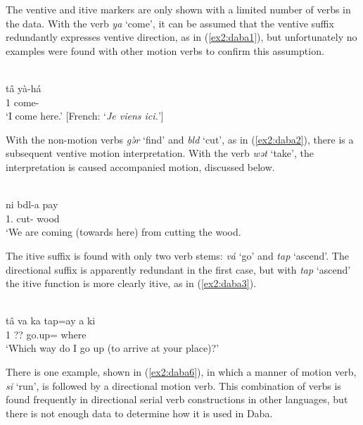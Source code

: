 The ventive and itive markers are only shown with a limited number of verbs in the data. With the verb  \textit{ya} `come', it can be assumed that the ventive suffix redundantly expresses ventive direction, as in (\ref{ex2:daba1}), but unfortunately no examples were found with other motion verbs to confirm this assumption.

\ea\label{ex2:daba1}
 \\
\gll tâ yà-há	\\
1 come- \\
\glt `I come here.' [French: `\textit{Je viens ici.}']
\z 

With the non-motion verbs \textit{gə̀r} `find' and \textit{bld} `cut', as in (\ref{ex2:daba2}), there is a subsequent ventive motion interpretation. With the verb \textit{wət} `take', the interpretation is caused accompanied motion, discussed below.

\ea\label{ex2:daba2}
 \\
\gll ni bdl-a pay \\
1. cut- wood \\
\glt `We are coming (towards here) from cutting the wood. 
\z 

The itive suffix is found with only two verb stems: \textit{vá} `go' and \textit{tap} `ascend'. The directional suffix is apparently redundant in the first case, but with \textit{tap} `ascend' the itive function is more clearly itive, as in (\ref{ex2:daba3}). 

\ea\label{ex2:daba3}
 \\
\gll tâ va ka tap=ay a ki \\
1  ?? go.up=  where	\\
\glt `Which way do I go up (to arrive at your place)?' 
\z 

There is one example, shown in (\ref{ex2:daba6}), in which a manner of motion verb, \textit{si} ‘run’, is followed by a directional motion verb. This combination of verbs is found frequently in directional serial verb constructions in other languages, but there is not enough data to determine how it is used in Daba. 

